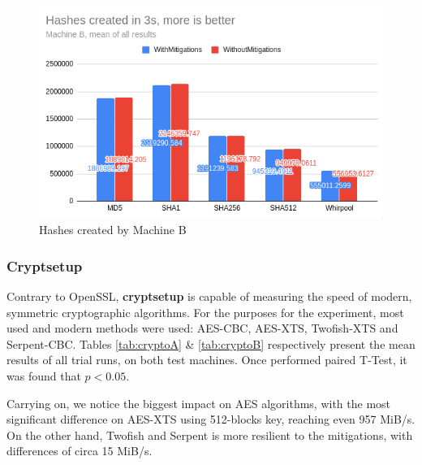 \documentclass{csfourzero}
\begin{document}
\begin{figure}[!h]
\centering
\includegraphics[width=13cm]{hashB}
\caption{Hashes created by Machine B}
\label{fig:hashB}
\end{figure}


\pagebreak

\subsubsection{Cryptsetup}

Contrary to OpenSSL, \textbf{cryptsetup} is capable of measuring the speed of modern, symmetric cryptographic algorithms. For the purposes for the experiment, most used and modern methods were used: AES-CBC, AES-XTS, Twofish-XTS and Serpent-CBC. Tables \ref{tab:cryptoA} \& \ref{tab:cryptoB} respectively present the mean results of all trial runs, on both test machines. Once performed paired T-Test, it was found that $p < 0.05$.

Carrying on, we notice the biggest impact on AES algorithms, with the most significant difference on AES-XTS using 512-blocks key, reaching even 957 MiB/s. On the other hand, Twofish and Serpent is more resilient to the mitigations, with differences of circa 15 MiB/s. 
\end{document}
